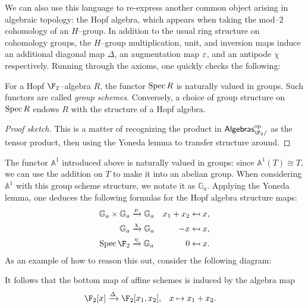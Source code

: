 We can also use this language to re-express another common object arising in algebraic topology: the Hopf algebra, which appears when taking the mod--$2$ cohomology of an $H$--group.  In addition to the usual ring structure on cohomology groups, the $H$--group multiplication, unit, and inversion maps induce an additional diagonal map $\Delta$, an augmentation map $\varepsilon$, and an antipode $\chi$ respectively.  Running through the axioms, one quickly checks the following:
\begin{lemma}
For a Hopf $\F_2$--algebra $R$, the functor $\operatorname{Spec} R$ is naturally valued in groups.  Such functors are called \textit{group schemes}.  Conversely, a choice of group structure on $\operatorname{Spec} R$ endows $R$ with the structure of a Hopf algebra.
\end{lemma}
\begin{proof}[Proof sketch]
This is a matter of recognizing the product in $\CatOf{Algebras}_{\F_2/}^{\mathrm{op}}$ as the tensor product, then using the Yoneda lemma to transfer structure around.
\end{proof}

\begin{example}\label{InformalAdditiveGroupExample}
The functor $\mathbb A^1$ introduced above is naturally valued in groups: since $\mathbb A^1(T) \cong T$, we can use the addition on $T$ to make it into an abelian group.  When considering $\mathbb A^1$ with this group scheme structure, we notate it as $\mathbb G_a$.  Applying the Yoneda lemma, one deduces the following formulas for the Hopf algebra structure maps:
\begin{align*}
\mathbb G_a \times \mathbb G_a & \xrightarrow{\mu} \mathbb G_a & x_1 + x_2 & \mapsfrom x, \\
\mathbb G_a & \xrightarrow{\chi} \mathbb G_a & -x & \mapsfrom x, \\
\Spec \F_2 & \xrightarrow{\eta} \mathbb G_a & 0 & \mapsfrom x.
\end{align*}
As an example of how to reason this out, consider the following diagram:
\begin{center}
\end{center}
It follows that the bottom map of affine schemes is induced by the algebra map
\begin{align*}
\F_2[x] & \xrightarrow{\Delta} \F_2[x_1, x_2], &
x & \mapsto x_1 + x_2.
\end{align*}
\end{example}

